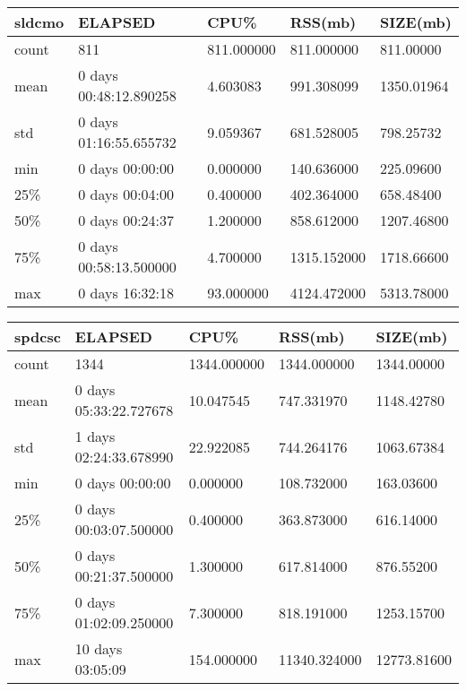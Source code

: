 \documentclass{article}
\begin{document}
\begin{table}[H]
\begin{tabular}{|l|l|l|l|l|}
\hline sldcmo& ELAPSED&   CPU\%&  RSS(mb)&   SIZE(mb) \\
\hline count&    811& 811.000000&  811.000000&  811.00000 \\
\hline mean&  0 days 00:48:12.890258&  4.603083&  991.308099& 1350.01964 \\
\hline std&  0 days 01:16:55.655732&  9.059367&  681.528005&  798.25732 \\
\hline min&   0 days 00:00:00&  0.000000&  140.636000&  225.09600 \\
\hline 25\%&   0 days 00:04:00&  0.400000&  402.364000&  658.48400 \\
\hline 50\%&   0 days 00:24:37&  1.200000&  858.612000& 1207.46800 \\
\hline 75\%&  0 days 00:58:13.500000&  4.700000& 1315.152000& 1718.66600 \\
\hline max&   0 days 16:32:18&  93.000000& 4124.472000& 5313.78000 \\
\hline 
\end{tabular}
\label{TABLE-SessionSizesldcmo}
\end{table}

\begin{table}[H]
\begin{tabular}{|l|l|l|l|l|}
\hline spdcsc& ELAPSED&    CPU\%&   RSS(mb)&  SIZE(mb) \\
\hline count&   1344& 1344.000000&  1344.000000&  1344.00000 \\
\hline mean&  0 days 05:33:22.727678&  10.047545&  747.331970&  1148.42780 \\
\hline std&  1 days 02:24:33.678990&  22.922085&  744.264176&  1063.67384 \\
\hline min&   0 days 00:00:00&   0.000000&  108.732000&  163.03600 \\
\hline 25\%&  0 days 00:03:07.500000&   0.400000&  363.873000&  616.14000 \\
\hline 50\%&  0 days 00:21:37.500000&   1.300000&  617.814000&  876.55200 \\
\hline 75\%&  0 days 01:02:09.250000&   7.300000&  818.191000&  1253.15700 \\
\hline max&  10 days 03:05:09&  154.000000& 11340.324000& 12773.81600 \\
\hline 
\end{tabular}
\label{TABLE-SessionSizespdcsc}
\end{table}
\end{document}
